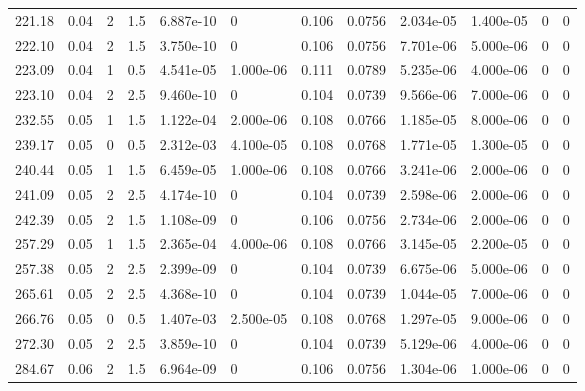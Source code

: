 \documentclass[preview]{standalone}
\begin{document}
{{\begin{tabular}{L{1.2cm}C{1.2cm} C{0.3cm}C{0.5cm} C{1.4cm}C{1.4cm} C{1.4cm}C{1.4cm} C{1.6cm}C{1.6cm} C{1.6cm}C{1.6cm}}
  221.18  &  0.04  & 2     & 1.5 &  6.887e-10  & 0  &  0.106&   0.0756& 2.034e-05 & 1.400e-05   &  0 & 0  \\ 
  222.10  &  0.04  & 2     & 1.5 &  3.750e-10  & 0  &  0.106&   0.0756& 7.701e-06 & 5.000e-06   &  0 & 0  \\ 
  223.09  &  0.04  & 1     & 0.5 &  4.541e-05  & 1.000e-06  &  0.111&   0.0789& 5.235e-06 & 4.000e-06   &  0 & 0  \\ 
  223.10  &  0.04  & 2     & 2.5 &  9.460e-10  & 0  &  0.104&   0.0739& 9.566e-06 & 7.000e-06   &  0 & 0  \\ 
  232.55  &  0.05  & 1     & 1.5 &  1.122e-04  & 2.000e-06  &  0.108&   0.0766& 1.185e-05 & 8.000e-06   &  0 & 0  \\ 
  239.17  &  0.05  & 0     & 0.5 &  2.312e-03  & 4.100e-05  &  0.108&   0.0768& 1.771e-05 & 1.300e-05   &  0 & 0  \\ 
  240.44  &  0.05  & 1     & 1.5 &  6.459e-05  & 1.000e-06  &  0.108&   0.0766& 3.241e-06 & 2.000e-06   &  0 & 0  \\ 
  241.09  &  0.05  & 2     & 2.5 &  4.174e-10  & 0  &  0.104&   0.0739& 2.598e-06 & 2.000e-06   &  0 & 0  \\ 
  242.39  &  0.05  & 2     & 1.5 &  1.108e-09  & 0  &  0.106&   0.0756& 2.734e-06 & 2.000e-06   &  0 & 0  \\ 
  257.29  &  0.05  & 1     & 1.5 &  2.365e-04  & 4.000e-06  &  0.108&   0.0766& 3.145e-05 & 2.200e-05   &  0 & 0  \\ 
  257.38  &  0.05  & 2     & 2.5 &  2.399e-09  & 0  &  0.104&   0.0739& 6.675e-06 & 5.000e-06   &  0 & 0  \\ 
  265.61  &  0.05  & 2     & 2.5 &  4.368e-10  & 0  &  0.104&   0.0739& 1.044e-05 & 7.000e-06   &  0 & 0  \\ 
  266.76  &  0.05  & 0     & 0.5 &  1.407e-03  & 2.500e-05  &  0.108&   0.0768& 1.297e-05 & 9.000e-06   &  0 & 0  \\ 
  272.30  &  0.05  & 2     & 2.5 &  3.859e-10  & 0  &  0.104&   0.0739& 5.129e-06 & 4.000e-06   &  0 & 0  \\ 
  284.67  &  0.06  & 2     & 1.5 &  6.964e-09  & 0  &  0.106&   0.0756& 1.304e-06 & 1.000e-06   &  0 & 0  \\ 
\hline 
\end{tabular} 

}}
\end{document}
